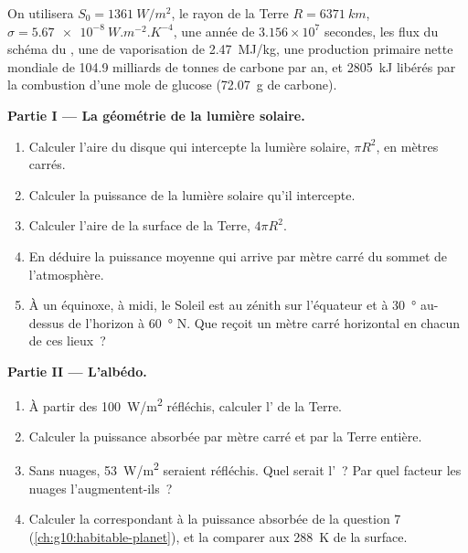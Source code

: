 \begin{problem}
\label{pb:g10:earth-energy-budget:1}
On utilisera $S_0 = \qty{1361}{W/m^2}$, le rayon de la Terre
$R = \qty{6371}{km}$,
$\sigma = \qty{5.67e-8}{W.m^{-2}.K^{-4}}$, une année
de $3.156\times10^7$ secondes, les flux du schéma du , une
 de vaporisation de \qty{2.47}{MJ/kg}, une production
primaire nette mondiale de \num{104.9} milliards de tonnes de carbone par
an, et \qty{2805}{kJ} libérés par la combustion d'une mole de glucose
(\qty{72.07}{g} de carbone).

\medskip
\noindent\textbf{Partie I --- La géométrie de la lumière solaire.}
\begin{enumerate}
  \item Calculer l'aire du disque qui intercepte la lumière solaire,
        $\pi R^2$, en mètres carrés.
  \item Calculer la puissance de la lumière solaire qu'il intercepte.
  \item Calculer l'aire de la surface de la Terre, $4\pi R^2$.
  \item En déduire la puissance moyenne qui arrive par mètre carré du
        sommet de l'atmosphère.
  \item À un équinoxe, à midi, le Soleil est au zénith sur l'équateur et à
        \qty{30}{\degree} au-dessus de l'horizon à \qty{60}{\degree} N. Que
        reçoit un mètre carré horizontal en chacun de ces lieux~?
\end{enumerate}

\medskip
\noindent\textbf{Partie II --- L'albédo.}
\begin{enumerate}[resume]
  \item À partir des \qty{100}{W/m^2} réfléchis, calculer l' de la
        Terre.
  \item Calculer la puissance absorbée par mètre carré et par la Terre
        entière.
  \item Sans nuages, \qty{53}{W/m^2} seraient réfléchis. Quel serait
        l'~? Par quel facteur les nuages l'augmentent-ils~?
  \item Calculer la  correspondant à la puissance
        absorbée de la question 7 (\cref{ch:g10:habitable-planet}), et la
        comparer aux \qty{288}{K} de la surface.
\end{enumerate}


\end{problem}
